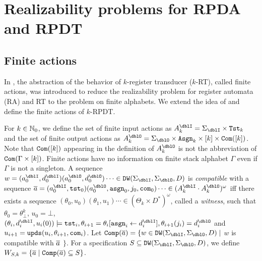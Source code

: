 \section{Realizability problems for RPDA and RPDT}


\subsection{Finite actions}
In \cite{EFR19}, the abstraction of the behavior of $k$-register transducer ($k$-RT), called finite actions, was introduced
to reduce the realizability problem for register automata (RA) and RT to
the problem on finite alphabets.
We extend the idea of \cite{EFR19} and define the finite actions of $k$-RPDT.

For $k\in\mathbb{N}_0$,
we define the set of finite input actions as $A_k^\dblI = \Sigma_\dblI\times \Tst_k$
and the set of finite output actions as $A_k^\dblO = \Sigma_\dblO\times \Asgn_k\times [k]\times \Com([k])$.
Note that $\mathtt{Com}([k])$ appearing in the definition of $A_k^\dblO$ is not the abbreviation of $\mathtt{Com}(\Gamma\times[k])$.
Finite actions have no information on finite stack alphabet $\Gamma$ even if $\Gamma$ is not a singleton.
A sequence $w = (a^\dblI_0,d^\dblI_0) (a^\dblO_0,d^\dblO_0)\cdots \in \DW(\Sigma_\dblI,\Sigma_\dblO,D)$ is \emph{compatible} with a sequence
$\overa = (a^\dblI_0, \tst_0)(a^\dblO_0,\asgn_0,j_0, \com_0)\cdots \in (A_k^\dblI\cdot A_k^\dblO)^\omega$
iff there exists a sequence $(\theta_0,u_0)(\theta_1, u_1)\cdots\in (\Theta_k\times D^*)^\omega$, called a \emph{witness}, such that
$\theta_0 = \theta^{k}_\bot$, $u_0 = \bot$,
$(\theta_i, d^\dblI_i, u_i(0)) \models \tst_i, \theta_{i+1}=\theta_i[\asgn_i\leftarrow d^\dblI_i], \theta_{i+1}(j_i) = d^\dblO_i$ and $u_{i+1}=\mathtt{upds}(u_i,\theta_{i+1},\mathtt{com}_i)$.
Let $\Comp(\overa) = \{w\in \DW(\Sigma_\dblI,\Sigma_\dblO,D)\mid$ $w$ is compatible with ${\overline{a}}$ $\}$.
For a specification $S \subseteq \DW(\Sigma_\dblI,\Sigma_\dblO,D)$, we define $W_{S,k}=\{{\overline{a}}\mid {\mathtt{Comp}}({\overline{a}})\subseteq S\}$.

